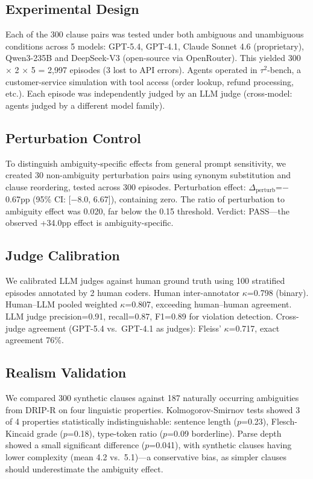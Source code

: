 \documentclass[11pt,a4paper]{article}
\newcommand{\tausq}{$\tau^2$-bench}
\begin{document}
\subsection{Experimental Design}

Each of the 300 clause pairs was tested under both ambiguous and unambiguous conditions across 5 models: GPT-5.4, GPT-4.1, Claude Sonnet 4.6 (proprietary), Qwen3-235B and DeepSeek-V3 (open-source via OpenRouter). This yielded 300 $\times$ 2 $\times$ 5 = 2{,}997 episodes (3 lost to API errors). Agents operated in \tausq{}, a customer-service simulation with tool access (order lookup, refund processing, etc.). Each episode was independently judged by an LLM judge (cross-model: agents judged by a different model family).

\subsection{Perturbation Control}

To distinguish ambiguity-specific effects from general prompt sensitivity, we created 30 non-ambiguity perturbation pairs using synonym substitution and clause reordering, tested across 300 episodes. Perturbation effect: $\Delta_{\text{perturb}}$=$-$0.67pp (95\% CI: [$-$8.0, 6.67]), containing zero. The ratio of perturbation to ambiguity effect was 0.020, far below the 0.15 threshold. Verdict: PASS---the observed +34.0pp effect is ambiguity-specific.

\subsection{Judge Calibration}

We calibrated LLM judges against human ground truth using 100 stratified episodes annotated by 2 human coders. Human inter-annotator $\kappa$=0.798 (binary). Human--LLM pooled weighted $\kappa$=0.807, exceeding human--human agreement. LLM judge precision=0.91, recall=0.87, F1=0.89 for violation detection. Cross-judge agreement (GPT-5.4 vs.\ GPT-4.1 as judges): Fleiss' $\kappa$=0.717, exact agreement 76\%.

\subsection{Realism Validation}

We compared 300 synthetic clauses against 187 naturally occurring ambiguities from DRIP-R on four linguistic properties. Kolmogorov-Smirnov tests showed 3 of 4 properties statistically indistinguishable: sentence length ($p$=0.23), Flesch-Kincaid grade ($p$=0.18), type-token ratio ($p$=0.09 borderline). Parse depth showed a small significant difference ($p$=0.041), with synthetic clauses having lower complexity (mean 4.2 vs.\ 5.1)---a conservative bias, as simpler clauses should underestimate the ambiguity effect.
\end{document}
